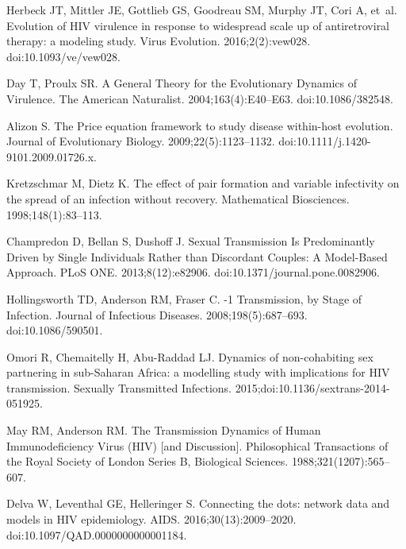 \documentclass[10pt,letterpaper]{article}
\begin{document}
\begin{thebibliography}{10}
Herbeck JT, Mittler JE, Gottlieb GS, Goodreau SM, Murphy JT, Cori A, et~al.
\newblock Evolution of {HIV} virulence in response to widespread scale up of
  antiretroviral therapy: a modeling study.
\newblock Virus Evolution. 2016;2(2):vew028.
\newblock doi:{10.1093/ve/vew028}.

Day T, Proulx SR.
\newblock A General Theory for the Evolutionary Dynamics of Virulence.
\newblock The American Naturalist. 2004;163(4):E40--E63.
\newblock doi:{10.1086/382548}.

Alizon S.
\newblock The {Price} equation framework to study disease within-host
  evolution.
\newblock Journal of Evolutionary Biology. 2009;22(5):1123--1132.
\newblock doi:{10.1111/j.1420-9101.2009.01726.x}.

Kretzschmar M, Dietz K.
\newblock The effect of pair formation and variable infectivity on the spread
  of an infection without recovery.
\newblock Mathematical Biosciences. 1998;148(1):83--113.

Champredon D, Bellan S, Dushoff J.
 Sexual Transmission Is Predominantly Driven by Single
  Individuals Rather than Discordant Couples: A Model-Based Approach.
\newblock PLoS ONE. 2013;8(12):e82906.
\newblock doi:{10.1371/journal.pone.0082906}.

Hollingsworth TD, Anderson RM, Fraser C.
-1 Transmission, by Stage of Infection.
\newblock Journal of Infectious Diseases. 2008;198(5):687--693.
\newblock doi:{10.1086/590501}.

Omori R, Chemaitelly H, Abu-Raddad LJ.
\newblock Dynamics of non-cohabiting sex partnering in sub-{Saharan} {Africa}:
  a modelling study with implications for {HIV} transmission.
\newblock Sexually Transmitted Infections.
  2015;doi:{10.1136/sextrans-2014-051925}.

May RM, Anderson RM.
\newblock The Transmission Dynamics of Human Immunodeficiency Virus (HIV) [and
  Discussion].
\newblock Philosophical Transactions of the Royal Society of London Series B,
  Biological Sciences. 1988;321(1207):565--607.

Delva W, Leventhal GE, Helleringer S.
\newblock Connecting the dots: network data and models in {HIV} epidemiology.
\newblock AIDS. 2016;30(13):2009--2020.
\newblock doi:{10.1097/QAD.0000000000001184}.


\end{thebibliography}
\end{document}
